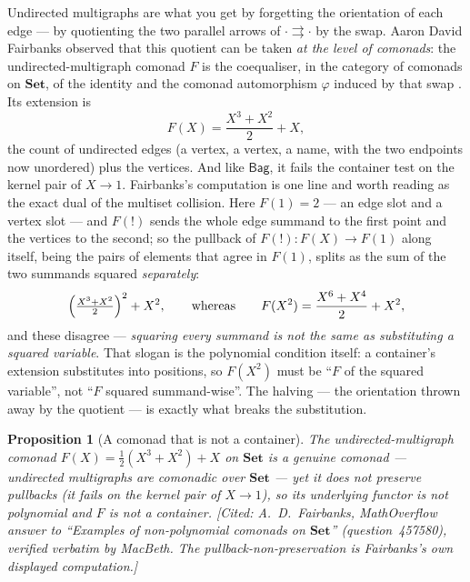 \documentclass[11pt,a4paper]{book}
\newcommand{\Set}{\mathbf{Set}}
\theoremstyle{plain}
\newtheorem{Proposition}[Theorem]{Proposition}
\theoremstyle{definition}
\theoremstyle{remark}
\newcommand{\prov}[1]{\hfill\textsf{\footnotesize[#1]}}
\begin{document}
Undirected multigraphs are what you get by forgetting the orientation of each edge --- by
quotienting the two parallel arrows of $\cdot\rightrightarrows\cdot$ by the swap. Aaron David
Fairbanks observed that this quotient can be taken \emph{at the level of comonads}: the
undirected-multigraph comonad $F$ is the coequaliser, in the category of comonads on $\Set$,
of the identity and the comonad automorphism $\varphi$ induced by that swap
\cite{Fairbanks25}. Its extension is
\[
  F(X)=\frac{X^{3}+X^{2}}{2}+X,
\]
the count of undirected edges (a vertex, a vertex, a name, with the two endpoints now
unordered) plus the vertices. And like $\mathsf{Bag}$, it fails the container test on the
kernel pair of $X\to 1$. Fairbanks's computation is one line and worth reading as the exact
dual of the multiset collision. Here $F(1)=2$ --- an edge slot and a vertex slot --- and
$F(!)$ sends the whole edge summand to the first point and the vertices to the second; so the
pullback of $F(!)\colon F(X)\to F(1)$ along itself, being the pairs of elements that agree in
$F(1)$, splits as the sum of the two summands squared \emph{separately}:
\[
  \Bigl(\tfrac{X^{3}+X^{2}}{2}\Bigr)^{2}+X^{2},\qquad\text{whereas}\qquad
  F(X^{2})=\frac{X^{6}+X^{4}}{2}+X^{2},
\]
and these disagree --- \emph{squaring every summand is not the same as substituting a squared
variable}. That slogan is the polynomial condition itself: a container's extension
substitutes into positions, so $F(X^{2})$ must be ``$F$ of the squared variable'', not ``$F$
squared summand-wise''. The halving --- the orientation thrown away by the quotient --- is
exactly what breaks the substitution.

\begin{Proposition}[A comonad that is not a container]\label{prop:multigraph-comonad}
The undirected-multigraph comonad $F(X)=\tfrac12(X^{3}+X^{2})+X$ on $\Set$ is a genuine
comonad --- undirected multigraphs are comonadic over $\Set$ --- yet it does not preserve
pullbacks (it fails on the kernel pair of $X\to 1$), so its underlying functor is not
polynomial and $F$ is not a container.
\prov{Cited: A.~D.~Fairbanks, MathOverflow answer to ``Examples of non-polynomial comonads on
$\Set$'' \cite{Fairbanks25} (question~457580), verified verbatim by MacBeth. The
pullback-non-preservation is Fairbanks's own displayed computation.}
\end{Proposition}
\end{document}
